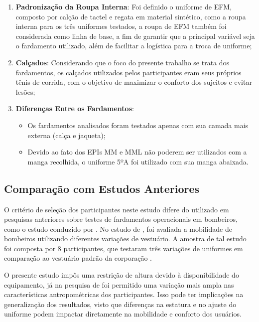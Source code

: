 \begin{enumerate}[label=\Roman*]
    \item \textbf{Padronização da Roupa Interna}: Foi definido o uniforme de \acrfull{EFM}, composto por calção de tactel e regata em material sintético, como a roupa interna para os três uniformes testados, a roupa de \acrshort{EFM} também foi considerada como linha de base, a fim de garantir que a principal variável seja o fardamento utilizado, além de facilitar a logística para a troca de uniforme;
    \item \textbf{Calçados}: Considerando que o foco do presente trabalho se trata dos fardamentos, 
    os calçados utilizados pelos participantes eram seus próprios tênis de corrida, com o objetivo de maximizar o conforto dos sujeitos e evitar lesões;
    \item \textbf{Diferenças Entre os Fardamentos}: 
    \begin{itemize}
        \item Os fardamentos analisados foram testados apenas com sua camada mais externa (calça e jaqueta);
        \item Devido ao fato dos \acrshort{EPI}s \acrshort{MM} e \acrshort{MML} não poderem ser utilizados com a manga recolhida, o uniforme 5ºA foi utilizado com sua manga abaixada.
    \end{itemize}
     
\end{enumerate}

\subsection{Comparação com Estudos Anteriores}

O critério de seleção dos participantes neste estudo difere do utilizado em pesquisas anteriores 
sobre testes de fardamentos operacionais em bombeiros, como o estudo conduzido por 
\textcite{orr2019impact}. No estudo de \textcite{orr2019impact}, foi avaliada a mobilidade de 
bombeiros utilizando diferentes variações de vestuário. A amostra de tal estudo foi composta por 
8 participantes, que testaram três variações de uniformes em comparação ao vestuário padrão da 
corporação \cite{orr2019impact}.

O presente estudo impôs uma restrição de altura devido à disponibilidade do equipamento, 
já na pesquisa de \textcite{orr2019impact} foi permitido uma variação mais ampla nas características 
antropométricas dos participantes. Isso pode ter implicações na generalização dos resultados, visto 
que diferenças na estatura e no ajuste do uniforme podem impactar diretamente na mobilidade e 
conforto dos usuários.

